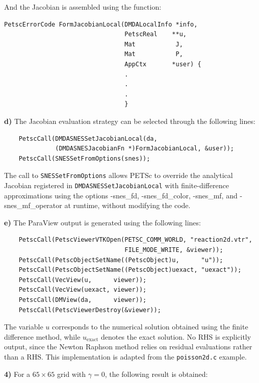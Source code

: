 \documentclass[12pt]{article}
\begin{document}
And the Jacobian is assembled using the function:


\begin{lstlisting}
PetscErrorCode FormJacobianLocal(DMDALocalInfo *info,
                                 PetscReal    **u,
                                 Mat           J,
                                 Mat           P,
                                 AppCtx       *user) {
                                 .
                                 .
                                 .
                                 }
\end{lstlisting}

\textbf{d)} The Jacobian evaluation strategy can be selected through the following lines:

\begin{lstlisting}
    PetscCall(DMDASNESSetJacobianLocal(da,
              (DMDASNESJacobianFn *)FormJacobianLocal, &user));
    PetscCall(SNESSetFromOptions(snes));
\end{lstlisting}

The call to \texttt{SNESSetFromOptions} allows PETSc to override the analytical Jacobian registered in \texttt{DMDASNESSetJacobianLocal} with finite-difference approximations using the options -snes\_fd, -snes\_fd\_color, -snes\_mf, and -snes\_mf\_operator at runtime, without modifying the code.

\textbf{e)} The ParaView output is generated using the following lines:

\begin{lstlisting}
    PetscCall(PetscViewerVTKOpen(PETSC_COMM_WORLD, "reaction2d.vtr",
                                 FILE_MODE_WRITE, &viewer));
    PetscCall(PetscObjectSetName((PetscObject)u,      "u"));
    PetscCall(PetscObjectSetName((PetscObject)uexact, "uexact"));
    PetscCall(VecView(u,      viewer));
    PetscCall(VecView(uexact, viewer));
    PetscCall(DMView(da,      viewer));
    PetscCall(PetscViewerDestroy(&viewer));
\end{lstlisting}

The variable $u$ corresponds to the numerical solution obtained using the finite difference method, while $u_{\text{exact}}$ denotes the exact solution. No RHS is explicitly output, since the Newton Raphson method relies on residual evaluations rather than a RHS. This implementation is adapted from the \texttt{poisson2d.c} example.

\textbf{4)} For a $65\times65$ grid with $\gamma = 0$, the following result is obtained:
\end{document}
